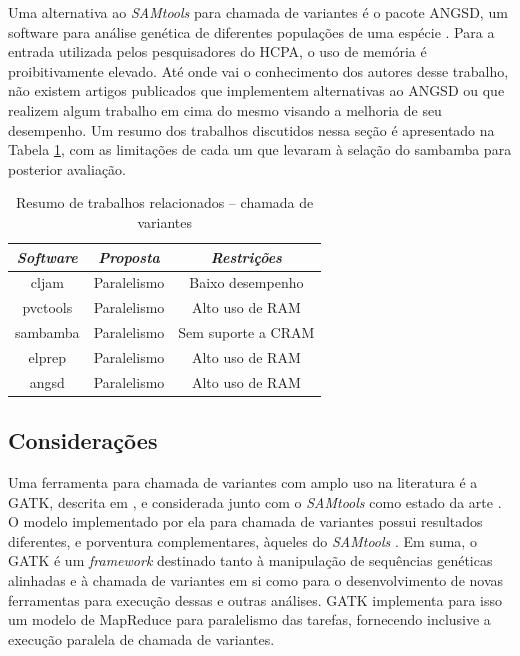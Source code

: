 \documentclass[cic,tc]{iiufrgs}
\begin{document}
Uma alternativa ao \textit{SAMtools} para chamada de variantes é o pacote ANGSD, um
software para análise genética de diferentes populações de uma espécie
\cite{korneliussen2014angsd}. Para a entrada utilizada pelos pesquisadores do
HCPA, o uso de memória é proibitivamente elevado. Até onde vai o conhecimento
dos autores desse trabalho, não existem artigos publicados que implementem
alternativas ao ANGSD ou que realizem algum trabalho em cima do mesmo visando a
melhoria de seu desempenho. Um resumo dos trabalhos discutidos nessa seção é
apresentado na Tabela \ref{tbl:calllit}, com as limitações de cada um que
levaram à selação do sambamba para posterior avaliação.

\begin{table}[h]
  \caption{Resumo de trabalhos relacionados -- chamada de variantes}
    \centering
        \begin{tabular}{c|c|c}
          \hline
          \textit{Software}  & \textit{Proposta} & \textit{Restrições}  \\
          \hline
          \hline
          cljam     & Paralelismo & Baixo desempenho   \\
          pvctools  & Paralelismo & Alto uso de RAM    \\
          sambamba  & Paralelismo & Sem suporte a CRAM \\
          elprep    & Paralelismo & Alto uso de RAM    \\
          angsd     & Paralelismo & Alto uso de RAM    \\
          \hline
        \end{tabular}
    \label{tbl:calllit}
\end{table}

\subsection{Considerações}
\label{sec:alt}

Uma ferramenta para chamada de variantes com amplo uso na literatura
\cite{de2017gatk} é a GATK, descrita em \cite{mckenna2010genome}, e considerada
junto com o \textit{SAMtools} como estado da
arte \cite{yao2020evaluation} \cite{poplin2018universal}. O modelo implementado
por ela para chamada de variantes possui resultados diferentes, e porventura
complementares, àqueles do
\textit{SAMtools} \cite{gezsi2015variantmetacaller} \cite{hwang2015systematic}. Em suma, o
GATK é um \textit{framework} destinado tanto à manipulação de sequências genéticas
alinhadas e à chamada de variantes em si como para o desenvolvimento de novas
ferramentas para execução dessas e outras análises. GATK implementa para isso
um modelo de MapReduce para paralelismo das tarefas, fornecendo inclusive a
execução paralela de chamada de variantes.
\end{document}
